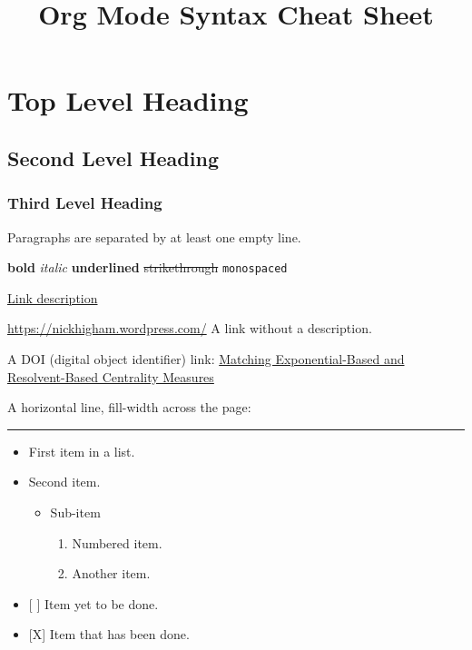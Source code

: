 \documentclass[]{article}
\title{Org Mode Syntax Cheat Sheet}
\date{}
\providecommand{\tightlist}{%
  \setlength{\itemsep}{0pt}\setlength{\parskip}{0pt}}
\begin{document}
\maketitle

\section{Top Level Heading}\label{top-level-heading}

\subsection{Second Level Heading}\label{second-level-heading}

\subsubsection{Third Level Heading}\label{third-level-heading}

Paragraphs are separated by at least one empty line.

\textbf{bold} \emph{italic} \textbf{underlined} \sout{strikethrough}
\texttt{monospaced}

\href{https://nickhigham.wordpress.com/}{Link description}

\url{https://nickhigham.wordpress.com/} A link without a description.

A DOI (digital object identifier) link:
\href{doi:10.1093/comnet/cnv016}{Matching Exponential-Based and
Resolvent-Based Centrality Measures}

A horizontal line, fill-width across the page:

\begin{center}\rule{0.5\linewidth}{\linethickness}\end{center}

\begin{itemize}
\tightlist
\item
  First item in a list.
\item
  Second item.

  \begin{itemize}
  \tightlist
  \item
    Sub-item

    \begin{enumerate}
    \tightlist
    \item
      Numbered item.
    \item
      Another item.
    \end{enumerate}
  \end{itemize}
\item
  {[} {]} Item yet to be done.
\item
  {[}X{]} Item that has been done.
\end{itemize}
\end{document}
